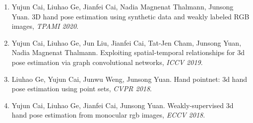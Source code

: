 \begin{enumerate}
\item Yujun Cai, Liuhao Ge, Jianfei Cai, Nadia Magnenat Thalmann, Junsong Yuan. 3D hand pose estimation using synthetic data and weakly labeled RGB images, \textit{TPAMI 2020}.

\item Yujun Cai, Liuhao Ge, Jun Liu, Jianfei Cai, Tat-Jen Cham, Junsong Yuan, Nadia Magnenat Thalmann. Exploiting spatial-temporal relationships for 3d pose estimation via graph convolutional networks, \textit{ICCV 2019}.

\item Liuhao Ge, Yujun Cai, Junwu Weng, Junsong Yuan. Hand pointnet: 3d hand pose estimation using point sets, \textit{CVPR 2018}.

\item Yujun Cai, Liuhao Ge, Jianfei Cai, Junsong Yuan. Weakly-supervised 3d hand pose estimation from monocular rgb images, \textit{ECCV 2018}.
\end{enumerate}